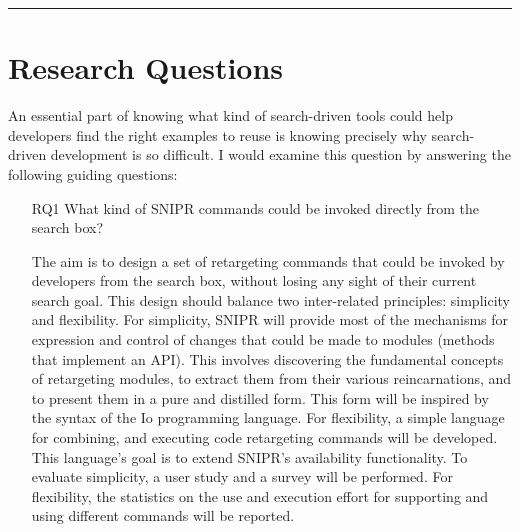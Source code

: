 \fancybreak{\pfbreakdisplay}

\section{Research Questions}
\label{sec:questions}

An essential part of knowing what kind of search-driven tools could help developers find the right examples to reuse is knowing precisely why search-driven development is so difficult. I would examine this question by answering the following guiding questions: 

\begin{itemize}
	
	\item[RQ1] What kind of \uppercase{SnipR} commands could be invoked directly from the search 
	box? 
	
	The aim is to design a set of retargeting commands that could be invoked by developers from the 
	search box, without losing any sight of their current search goal. This design should balance 
	two inter-related principles: simplicity and flexibility. For simplicity, SNIPR will provide 
	most of the mechanisms for expression and control of changes that could be made to modules 
	(methods that implement an API). This involves discovering the fundamental concepts of 
	retargeting modules, to extract them from their various reincarnations, and to present them in a 
	pure and distilled form. This form will be inspired by the syntax of the Io programming 
	language. For flexibility, a simple language for combining, and executing code retargeting 
	commands will be developed. This language's goal is to extend \uppercase{SnipR}'s availability 
	functionality. To evaluate simplicity, a user study and a survey will be performed. For 
	flexibility, the statistics on the use and execution effort for supporting and using different 
	commands will be reported.
		

\end{itemize}
